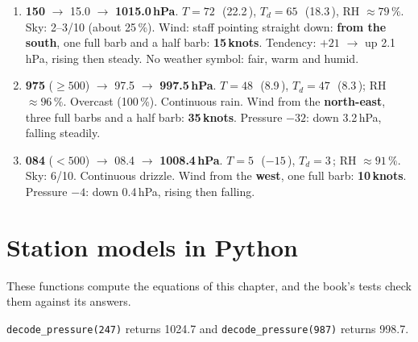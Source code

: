 \begin{answerbox}
\begin{enumerate}[label=\textbf{\thechapter.\arabic*},leftmargin=*,itemsep=3pt]
\item \textbf{150} $\to$ 15.0 $\to$ \textbf{1015.0\,hPa}. $T=72$\,\degF\ (22.2\,\degC), $T_d=65$\,\degF\ (18.3\,\degC), RH $\approx79\,\%$. Sky: 2--3/10 (about 25\,\%). Wind: staff pointing straight down: \textbf{from the south}, one full barb and a half barb: \textbf{15\,knots}. Tendency: $+21$ $\to$ up 2.1\,hPa, rising then steady. No weather symbol: fair, warm and humid.
\item \textbf{975} ($\ge500$) $\to$ 97.5 $\to$ \textbf{997.5\,hPa}. $T=48$\,\degF\ (8.9\,\degC), $T_d=47$\,\degF\ (8.3\,\degC); RH $\approx96\,\%$. Overcast (100\,\%). Continuous rain. Wind from the \textbf{north-east}, three full barbs and a half barb: \textbf{35\,knots}. Pressure $-32$: down 3.2\,hPa, falling steadily.
\item \textbf{084} ($<500$) $\to$ 08.4 $\to$ \textbf{1008.4\,hPa}. $T=5$\,\degF\ ($-15$\,\degC), $T_d=3$\,\degF; RH $\approx91\,\%$. Sky: 6/10. Continuous drizzle. Wind from the \textbf{west}, one full barb: \textbf{10\,knots}. Pressure $-4$: down 0.4\,hPa, rising then falling.
\end{enumerate}
\end{answerbox}

\section{Station models in Python}

These functions compute the equations of this chapter, and the book's tests check them against its answers.





\verb|decode_pressure(247)| returns 1024.7 and \verb|decode_pressure(987)| returns 998.7.
